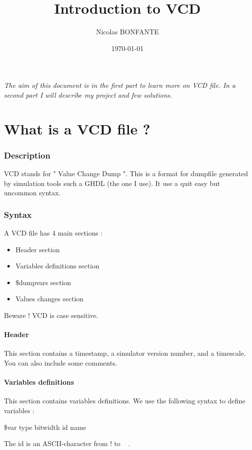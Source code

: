 \documentclass[a4paper]{article}
\title{Introduction to VCD}
\author{Nicolas BONFANTE}
\date{\today}
\begin{document}
\maketitle

\begin{center}
\textit{The aim of this document is in the first part to learn more on VCD file. In a second part I will describe my project and few solutions. }
\end{center}

\newpage

\part{What is a VCD file ?}

\section{Description}
VCD stands for " Value Change Dump ". This is a format for dumpfile generated by simulation tools such a GHDL (the one I use). It use a quit easy but uncommon syntax.

\section{Syntax}

A VCD file has 4 main sections : 
\begin{itemize}
\item Header section 
\item Variables definitions section 
\item \$dumpvars section 
\item Values changes section 
\end{itemize}

Beware ! VCD is case sensitive.

\subsection{Header}
This section contains a timestamp, a simulator version number, and a timescale. You can also include some comments.
\subsection{Variables definitions}
This section contains variables definitions. We use the following syntax to define variables :
\begin{center}
\$var type bitwidth id name
\end{center}
The id is an ASCII-character from  ! to ~ .
\end{document}
